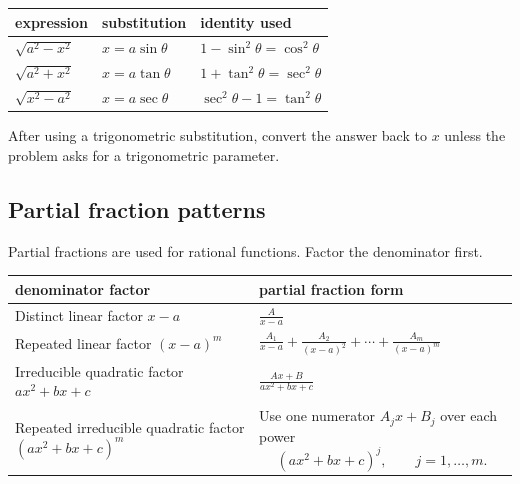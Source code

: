 \begin{center}
\renewcommand{\arraystretch}{1.8}
\begin{tabular}{p{}|p{}|p{}}
\textbf{expression} & \textbf{substitution} & \textbf{identity used} \\ \hline

\(\sqrt{a^2-x^2}\) &
\(x=a\sin\theta\) &
\(1-\sin^2\theta=\cos^2\theta\) \\

\(\sqrt{a^2+x^2}\) &
\(x=a\tan\theta\) &
\(1+\tan^2\theta=\sec^2\theta\) \\

\(\sqrt{x^2-a^2}\) &
\(x=a\sec\theta\) &
\(\sec^2\theta-1=\tan^2\theta\)
\end{tabular}
\end{center}

After using a trigonometric substitution, convert the answer back to \(x\) unless the
problem asks for a trigonometric parameter.

\subsection{Partial fraction patterns}
\label{appsubsec:partial-fraction-patterns}

Partial fractions are used for rational functions.  Factor the denominator first.

\begin{center}
\renewcommand{\arraystretch}{1.9}
\begin{tabular}{p{}|p{}}
\textbf{denominator factor} & \textbf{partial fraction form} \\ \hline

Distinct linear factor \(x-a\) &
\(\displaystyle \frac{A}{x-a}\) \\

Repeated linear factor \((x-a)^m\) &
\(\displaystyle
\frac{A_1}{x-a}
+
\frac{A_2}{(x-a)^2}
+\cdots+
\frac{A_m}{(x-a)^m}
\) \\

Irreducible quadratic factor \(ax^2+bx+c\) &
\(\displaystyle
\frac{Ax+B}{ax^2+bx+c}
\) \\

Repeated irreducible quadratic factor \((ax^2+bx+c)^m\) &
Use one numerator \(A_jx+B_j\) over each power
\[
(ax^2+bx+c)^j,
\qquad j=1,\ldots,m.
\]
\end{tabular}
\end{center}

